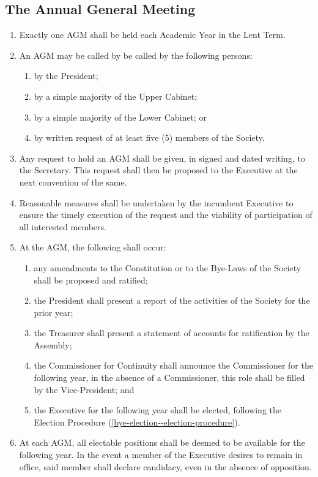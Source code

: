 \documentclass{scrartcl}
\begin{document}
        \subsection{The Annual General Meeting}
            \label{gm--agm}
            \begin{enumerate}
                \item Exactly one AGM shall be held each Academic Year in the Lent Term.
                \item An AGM may be called by be called by the following persons:
                    \begin{enumerate}
                        \item by the President;
                        \item by a simple majority of the Upper Cabinet;
                        \item by a simple majority of the Lower Cabinet; or
                        \item by written request of at least five (5) members of the Society.
                    \end{enumerate}
                \item Any request to hold an AGM shall be given, in signed and dated writing, to the Secretary. This request shall then be proposed to the Executive at the next convention of the same.
                \item Reasonable measures shall be undertaken by the incumbent Executive to ensure the timely execution of the request and the viability of participation of all interested members.
                \item At the AGM, the following shall occur:
                    \begin{enumerate}
                        \item any amendments to the Constitution or to the Bye-Laws of the Society shall be proposed and ratified;
                        \item the President shall present a report of the activities of the Society for the prior year;
                        \item the Treasurer shall present a statement of accounts for ratification by the Assembly;
                        \item the Commissioner for Continuity shall announce the Commissioner for the following year, in the absence of a Commissioner, this role shall be filled by the Vice-President; and
                        \item the Executive for the following year shall be elected, following the Election Procedure (\ref{bye-election--election-procedure}).
                    \end{enumerate}
                \item At each AGM, all electable positions shall be deemed to be available for the following year.
                    \subitem In the event a member of the Executive desires to remain in office, said member shall declare candidacy, even in the absence of opposition.
            \end{enumerate}
\end{document}
